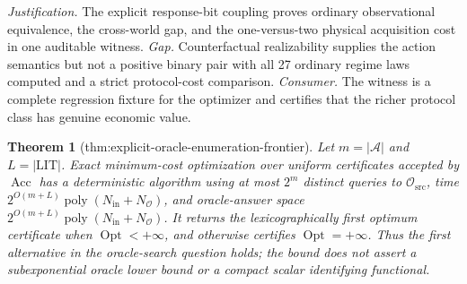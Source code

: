 \documentclass{article}
\newtheorem{theorem}{Theorem}
\begin{document}
\par\smallskip\noindent \textit{Justification.} The explicit response-bit coupling proves ordinary observational equivalence, the cross-world gap, and the one-versus-two physical acquisition cost in one auditable witness. \textit{Gap.} Counterfactual realizability supplies the action semantics but not a positive binary pair with all 27 ordinary regime laws computed and a strict protocol-cost comparison. \textit{Consumer.} The witness is a complete regression fixture for the optimizer and certifies that the richer protocol class has genuine economic value.

\begin{theorem}[thm:explicit-oracle-enumeration-frontier]\label{thm:explicit-oracle-enumeration-frontier}
Let \(m=|\mathcal A|\) and \(L=|\mathrm{LIT}|\).  Exact minimum-cost optimization over uniform certificates accepted by \(\operatorname{Acc}\) has a deterministic algorithm using at most \(2^m\) distinct queries to \(\mathcal O_{\mathrm{src}}\), time \(2^{O(m+L)}\operatorname{poly}(N_{\mathrm{in}}+N_{\mathcal O})\), and oracle-answer space \(2^{O(m+L)}\operatorname{poly}(N_{\mathrm{in}}+N_{\mathcal O})\).  It returns the lexicographically first optimum certificate when \(\operatorname{Opt}<+\infty\), and otherwise certifies \(\operatorname{Opt}=+\infty\).  Thus the first alternative in the oracle-search question holds; the bound does not assert a subexponential oracle lower bound or a compact scalar identifying functional.
\end{theorem}
\end{document}
